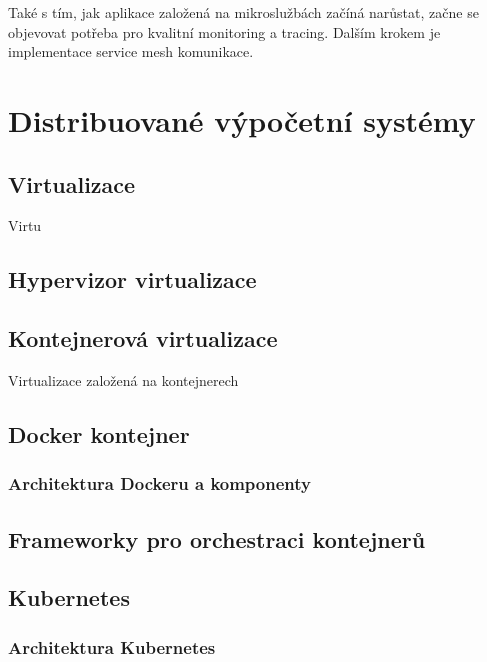 \documentclass[thesis=M,czech]{FITthesis}[2019/12/23]
\theoremstyle{plain}
\theoremstyle{definition}
\begin{document}
Také s tím, jak aplikace založená na mikroslužbách začíná narůstat, začne se objevovat potřeba pro kvalitní monitoring a tracing. Dalším krokem je implementace service mesh komunikace.



\section{Distribuované výpočetní systémy}

\subsection{Virtualizace}

Virtu

\subsection{Hypervizor virtualizace}



\subsection{Kontejnerová virtualizace}



Virtualizace založená na kontejnerech

\subsection{Docker kontejner}




\subsubsection{Architektura Dockeru a komponenty}
\subsection{Frameworky pro orchestraci kontejnerů}
\subsection{Kubernetes}

\subsubsection{Architektura Kubernetes}
\end{document}
